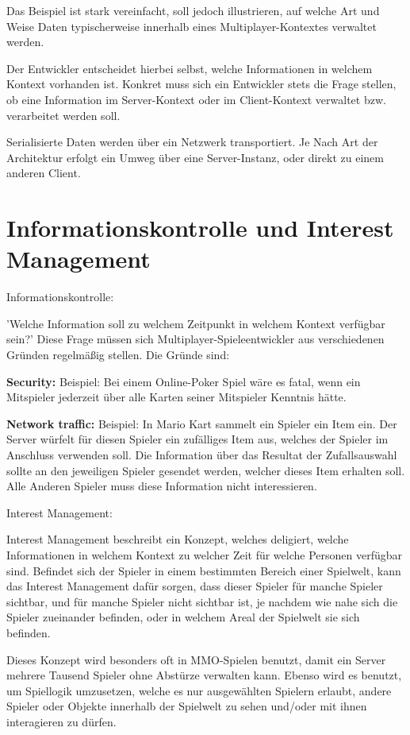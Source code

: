 Das Beispiel ist stark vereinfacht, soll jedoch illustrieren, auf welche Art und Weise Daten typischerweise innerhalb eines Multiplayer-Kontextes verwaltet werden.

Der Entwickler entscheidet hierbei selbst, welche Informationen in welchem Kontext vorhanden ist. Konkret muss sich ein Entwickler stets die Frage stellen, ob eine Information im Server-Kontext oder im Client-Kontext verwaltet bzw. verarbeitet werden soll.

Serialisierte Daten werden über ein Netzwerk transportiert. Je Nach Art der Architektur erfolgt ein Umweg über eine Server-Instanz, oder direkt zu einem anderen Client. \cite{Smed.2002c}

\section{Informationskontrolle und Interest Management}

\textsf{\Large Informationskontrolle:}

'Welche Information soll zu welchem Zeitpunkt in welchem Kontext verfügbar sein?' Diese Frage müssen sich Multiplayer-Spieleentwickler aus verschiedenen Gründen regelmäßig stellen.
Die Gründe sind:

\textbf{Security:}
Beispiel: Bei einem Online-Poker Spiel wäre es fatal, wenn ein Mitspieler jederzeit über alle Karten seiner Mitspieler Kenntnis hätte. 

\textbf{Network traffic:}
Beispiel: In Mario Kart sammelt ein Spieler ein Item ein. Der Server würfelt für diesen Spieler ein zufälliges Item aus, welches der Spieler im Anschluss verwenden soll. Die Information über das Resultat der Zufallsauswahl sollte an den jeweiligen Spieler gesendet werden, welcher dieses Item erhalten soll. Alle Anderen Spieler muss diese Information nicht interessieren.
 
\textsf{\Large Interest Management:}
\label{interest_management}

Interest Management beschreibt ein Konzept, welches deligiert, welche Informationen in welchem Kontext zu welcher Zeit für welche Personen verfügbar sind. Befindet sich der Spieler in einem bestimmten Bereich einer Spielwelt, kann das Interest Management dafür sorgen, dass dieser Spieler für manche Spieler sichtbar, und für manche Spieler nicht sichtbar ist, je nachdem wie nahe sich die Spieler zueinander befinden, oder in welchem Areal der Spielwelt sie sich befinden.

Dieses Konzept wird besonders oft in MMO-Spielen \cite{Wikipedia.2021i} benutzt, damit ein Server mehrere Tausend Spieler ohne Abstürze verwalten kann. Ebenso wird es benutzt, um Spiellogik umzusetzen, welche es nur ausgewählten Spielern erlaubt, andere Spieler oder Objekte innerhalb der Spielwelt zu sehen und/oder mit ihnen interagieren zu dürfen.

